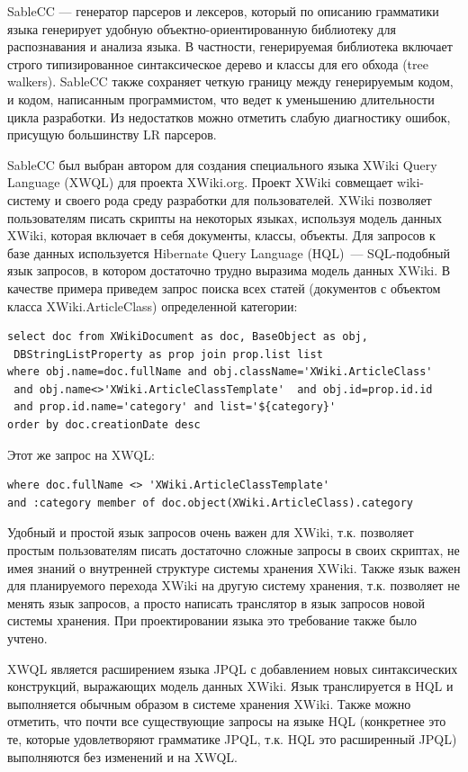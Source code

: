 \documentclass[a4paper,12pt,titlepage]{extarticle}
\begin{document}
SableCC --- генератор парсеров и лексеров, который по описанию грамматики языка
генерирует удобную объектно-ориентированную библиотеку для распознавания
и анализа языка. В частности, генерируемая
библиотека включает строго типизированное синтаксическое дерево и классы для
его обхода (tree walkers). SableCC  также сохраняет четкую границу между
генерируемым кодом, и кодом, написанным программистом, что ведет к уменьшению
длительности цикла разработки. Из недостатков можно отметить слабую диагностику
ошибок, присущую большинству LR парсеров.

SableCC был выбран автором для создания специального языка XWiki Query Language
(XWQL) \cite{xwql} для проекта XWiki.org. Проект XWiki совмещает wiki-систему и
своего рода среду разработки для пользователей. XWiki позволяет пользователям
писать скрипты на некоторых языках, используя модель данных XWiki, которая
включает в себя документы, классы, объекты. Для запросов к базе данных
используется Hibernate Query Language (HQL)~--- SQL-подобный язык запросов, в
котором достаточно трудно выразима модель данных XWiki. В качестве примера
приведем запрос поиска всех статей (документов с объектом класса
XWiki.ArticleClass) определенной категории:
\begin{verbatim}
select doc from XWikiDocument as doc, BaseObject as obj, 
 DBStringListProperty as prop join prop.list list
where obj.name=doc.fullName and obj.className='XWiki.ArticleClass' 
 and obj.name<>'XWiki.ArticleClassTemplate'  and obj.id=prop.id.id
 and prop.id.name='category' and list='${category}'
order by doc.creationDate desc
\end{verbatim}
Этот же запрос на XWQL:
\begin{verbatim}
where doc.fullName <> 'XWiki.ArticleClassTemplate' 
and :category member of doc.object(XWiki.ArticleClass).category
\end{verbatim}
Удобный и простой язык запросов очень важен для XWiki, т.к. позволяет простым
пользователям писать достаточно сложные запросы в своих скриптах, не имея
знаний о внутренней структуре системы хранения XWiki. Также язык важен для
планируемого перехода XWiki на другую систему хранения, т.к. позволяет не менять
язык запросов, а просто написать транслятор в язык запросов новой системы
хранения. При проектировании языка это требование также было учтено.

XWQL является расширением языка JPQL \cite{jpql} с добавлением новых
синтаксических конструкций, выражающих модель данных XWiki. Язык транслируется
в HQL и выполняется обычным образом в системе хранения XWiki.  Также
можно отметить, что почти все существующие запросы на языке HQL (конкретнее это
те, которые удовлетворяют грамматике JPQL, т.к. HQL это расширенный JPQL)
выполняются без изменений и на XWQL.
\end{document}
